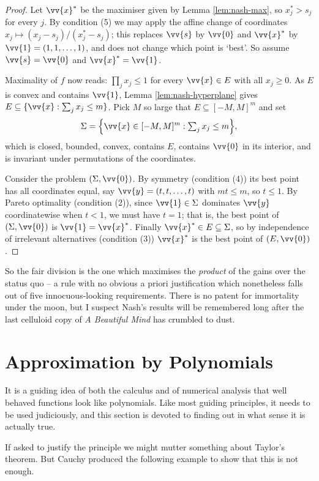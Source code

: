 \begin{proof}
	Let $\vv{x}^*$ be the maximiser given by Lemma \ref{lem:nash-max}, so $x^*_j > s_j$ for every $j$. By condition (5) we may apply the affine change of coordinates $x_j \mapsto (x_j - s_j)/(x_j^*-s_j)$; this replaces $\vv{s}$ by $\vv{0}$ and $\vv{x}^*$ by $\vv{1}=(1,1,\ldots,1)$, and does not change which point is `best'. So assume $\vv{s} = \vv{0}$ and $\vv{x}^*=\vv{1}$.

	Maximality of $f$ now reads: $\prod_j x_j \leq 1$ for every $\vv{x} \in E$ with all $x_j \geq 0$. As $E$ is convex and contains $\vv{1}$, Lemma \ref{lem:nash-hyperplane} gives $E \subseteq \{\vv{x} : \sum_j x_j \leq m\}$. Pick $M$ so large that $E \subseteq [-M,M]^m$ and set
	$$\Sigma = \Big\{\vv{x} \in [-M,M]^m : \textstyle\sum_j x_j \leq m\Big\},$$
	which is closed, bounded, convex, contains $E$, contains $\vv{0}$ in its interior, and is invariant under permutations of the coordinates.

	Consider the problem $(\Sigma,\vv{0})$. By symmetry (condition (4)) its best point has all coordinates equal, say $\vv{y} = (t,t,\ldots,t)$ with $mt\leq m$, so $t\leq 1$. By Pareto optimality (condition (2)), since $\vv{1}\in\Sigma$ dominates $\vv{y}$ coordinatewise when $t<1$, we must have $t=1$; that is, the best point of $(\Sigma,\vv{0})$ is $\vv{1} = \vv{x}^*$. Finally $\vv{x}^*\in E \subseteq \Sigma$, so by independence of irrelevant alternatives (condition (3)) $\vv{x}^*$ is the best point of $(E,\vv{0})$.
\end{proof}

So the fair division is the one which maximises the \emph{product} of the gains over the status quo -- a rule with no obvious a priori justification which nonetheless falls out of five innocuous-looking requirements. There is no patent for immortality under the moon, but I suspect Nash's results will be remembered long after the last celluloid copy of \emph{A Beautiful Mind} has crumbled to dust.

\section{Approximation by Polynomials}

It is a guiding idea of both the calculus and of numerical analysis that well behaved functions look like polynomials. Like most guiding principles, it needs to be used judiciously, and this section is devoted to finding out in what sense it is actually true.

If asked to justify the principle we might mutter something about Taylor's theorem. But Cauchy produced the following example to show that this is not enough.

